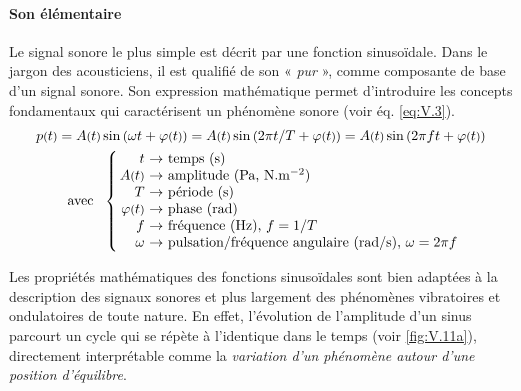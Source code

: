 \paragraph*{Son élémentaire} Le signal sonore le plus simple est décrit par une fonction sinusoïdale. Dans le jargon des acousticiens, il est qualifié de son « \emph{pur} », comme composante de base
 d'un signal sonore.
Son expression mathématique permet d'introduire les concepts fondamentaux qui caractérisent un phénomène sonore (voir éq. \ref{eq:V.3}).
\begin{equation}
\begin{array}{@{}c@{}}
p\vars{t} = A\vars{t} \sin\var{\omega t + \varphi\vars{t}} = A\vars{t} \sin\var{{2\pi t}/{T} + \varphi\vars{t}}
= A\vars{t} \sin\var{2\pi f t + \varphi\vars{t}} \\[1ex]
\mbox{~avec~~}\left \{ \begin{tabular}[c]{@{\,}r@{~}l@{}}
$t$ $\rightarrow$ & temps (s)\\
$A\vars{t}$ $\rightarrow$ & amplitude (Pa, $\mbox{N}.\mbox{m}^{-2}$)\\
$T$ $\rightarrow$ & période (s)\\
$\varphi\vars{t}$ $\rightarrow$ & phase (rad)\\
$f$ $\rightarrow$ & fréquence (Hz), $f = 1/T$ \\
$\omega$ $\rightarrow$ & pulsation/fréquence angulaire (rad/s), $\omega = 2\pi f$ \\
\end{tabular}\right.
\end{array}
\label{eq:V.3}
\end{equation}

Les propriétés mathématiques des fonctions sinusoïdales sont bien adaptées à la description des signaux sonores
et plus largement des phénomènes vibratoires et ondulatoires de toute nature. En effet, l'évolution de l'amplitude d'un sinus parcourt un cycle qui se répète à l'identique dans le temps (voir \cref{fig:V.11a}), directement interprétable comme la \emph{variation d'un phénomène autour d'une position d'équilibre}.


